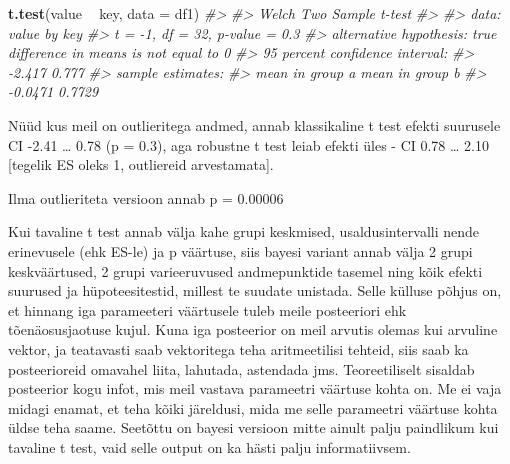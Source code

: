 \documentclass[]{book}
\newenvironment{Shaded}{\begin{snugshade}}{\end{snugshade}}
\newcommand{\CommentTok}[1]{\textcolor[rgb]{0.56,0.35,0.01}{\textit{#1}}}
\newcommand{\DataTypeTok}[1]{\textcolor[rgb]{0.13,0.29,0.53}{#1}}
\newcommand{\DecValTok}[1]{\textcolor[rgb]{0.00,0.00,0.81}{#1}}
\newcommand{\FloatTok}[1]{\textcolor[rgb]{0.00,0.00,0.81}{#1}}
\newcommand{\KeywordTok}[1]{\textcolor[rgb]{0.13,0.29,0.53}{\textbf{#1}}}
\newcommand{\NormalTok}[1]{#1}
\newcommand{\OperatorTok}[1]{\textcolor[rgb]{0.81,0.36,0.00}{\textbf{#1}}}
\newcommand{\StringTok}[1]{\textcolor[rgb]{0.31,0.60,0.02}{#1}}
\begin{document}
\begin{Shaded}
\begin{Highlighting}[]
\KeywordTok{t.test}\NormalTok{(value }\OperatorTok{~}\StringTok{ }\NormalTok{key, }\DataTypeTok{data =}\NormalTok{ df1)}
\CommentTok{#> }
\CommentTok{#>  Welch Two Sample t-test}
\CommentTok{#> }
\CommentTok{#> data:  value by key}
\CommentTok{#> t = -1, df = 32, p-value = 0.3}
\CommentTok{#> alternative hypothesis: true difference in means is not equal to 0}
\CommentTok{#> 95 percent confidence interval:}
\CommentTok{#>  -2.417  0.777}
\CommentTok{#> sample estimates:}
\CommentTok{#> mean in group a mean in group b }
\CommentTok{#>         -0.0471          0.7729}
\end{Highlighting}
\end{Shaded}

Nüüd kus meil on outlieritega andmed, annab klassikaline t test efekti suurusele
CI -2.41 \ldots{} 0.78 (p = 0.3), aga robustne t test leiab efekti üles -
CI 0.78 \ldots{} 2.10 {[}tegelik ES oleks 1, outliereid arvestamata{]}.

Ilma outlieriteta versioon annab p = 0.00006

\begin{Shaded}
\end{Shaded}

Kui tavaline t test annab välja kahe grupi keskmised, usaldusintervalli nende erinevusele (ehk ES-le) ja p väärtuse, siis bayesi variant annab välja 2 grupi keskväärtused, 2 grupi varieeruvused andmepunktide tasemel ning kõik efekti suurused ja hüpoteesitestid, millest te suudate unistada. Selle külluse põhjus on, et hinnang iga parameeteri väärtusele tuleb meile posteeriori ehk tõenäosusjaotuse kujul. Kuna iga posteerior on meil arvutis olemas kui arvuline vektor, ja teatavasti saab vektoritega teha aritmeetilisi tehteid, siis saab ka posteerioreid omavahel liita, lahutada, astendada jms. Teoreetiliselt sisaldab posteerior kogu infot, mis meil vastava parameetri väärtuse kohta on. Me ei vaja midagi enamat, et teha kõiki järeldusi, mida me selle parameetri väärtuse kohta üldse teha saame. Seetõttu on bayesi versioon mitte ainult palju paindlikum kui tavaline t test, vaid selle output on ka hästi palju informatiivsem.
\end{document}
